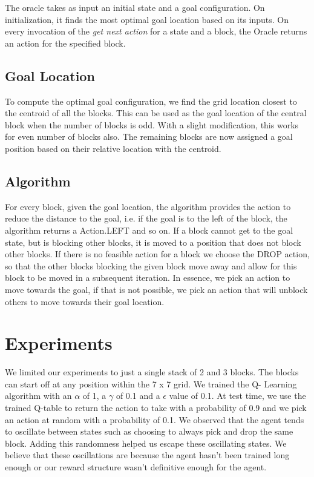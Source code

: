 \documentclass[letterpaper, 12 pt, conference]{ieeeconf}
\begin{document}
The oracle takes as input an initial state and a goal configuration. On initialization, it finds the most optimal goal location based on its inputs. On every invocation of the \textit{get next action} for a state and a block, the Oracle returns an action for the specified block.  

\subsection{Goal Location}
To compute the optimal goal configuration, we find the grid location closest to the centroid of all the blocks. This can be used as the goal location of the central block when the number of blocks is odd. With a slight modification, this works for even number of blocks also. The remaining blocks are now assigned a goal position based on their relative location with the centroid.

\subsection{Algorithm}
For every block, given the goal location, the algorithm provides the action to reduce the distance to the goal, i.e. if the goal is to the left of the block, the algorithm returns a Action.LEFT and so on. If a block cannot get to the goal state, but is blocking other blocks, it is moved to a position that does not block other blocks. If there is no feasible action for a block we choose the DROP action, so that the other blocks blocking the given block move away and allow for this block to be moved in a subsequent iteration. 
In essence, we pick an action to move towards the goal, if that is not possible, we pick an action that will unblock others to move towards their goal location. 

\section{Experiments}

We limited our experiments to just  a single stack of 2 and 3 blocks. The blocks can start off at any position within the 7 x 7 grid. We trained the Q- Learning algorithm with an $\alpha$ of 1, a $\gamma$ of 0.1 and a $\epsilon$ value of 0.1. 
At test time, we use the trained Q-table to return the action to take with a probability of 0.9 and we pick an action at random with a probability of 0.1. We observed that the agent tends to oscillate between states such as choosing to always pick and drop the same block. Adding this randomness helped us escape these oscillating states. We believe that these oscillations are because the agent hasn't been trained long enough or our reward structure wasn't definitive enough for the agent.
\end{document}
